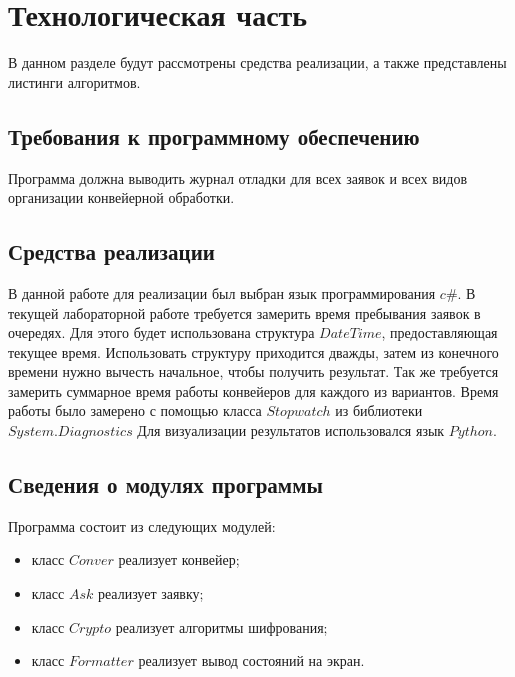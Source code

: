 \chapter{Технологическая часть}
В данном разделе будут рассмотрены средства реализации, а также представлены листинги алгоритмов.
\section{Требования к программному обеспечению }

Программа должна выводить журнал отладки для всех заявок и всех видов организации конвейерной обработки. 

\section{Средства реализации}
В данной работе для реализации был выбран язык программирования $c\#$. В текущей лабораторной работе требуется замерить время пребывания заявок в очередях. Для этого будет использована структура $DateTime$, предоставляющая текущее время. Использовать структуру приходится дважды, затем из конечного времени
нужно вычесть начальное, чтобы получить результат. Так же требуется замерить суммарное время работы конвейеров для каждого из вариантов. Время работы было замерено с помощью класса $Stopwatch$ из библиотеки $System.Diagnostics$   Для визуализации результатов использовался язык $Python$.

\newpage
\section{Сведения о модулях программы}
Программа состоит из следующих модулей:
\begin{itemize}
	\item класс $Conver$ реализует конвейер; 
	\item класс $Ask$ реализует заявку;
	\item класс $Crypto$ реализует алгоритмы шифрования;
	\item класс $Formatter$ реализует вывод состояний на экран.
\end{itemize}

